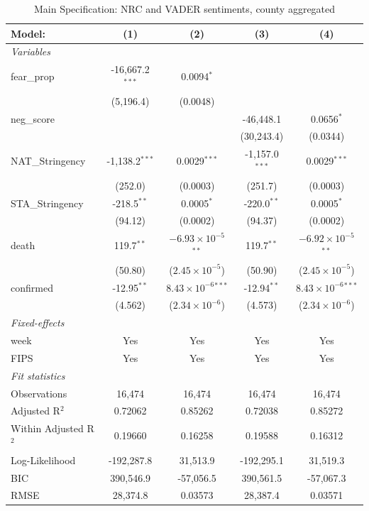 \documentclass{article}
\newcommand{\ra}[1]{\renewcommand{\arraystretch}{#1}}
\begin{document}
\begin{singlespace}
\centering
\begin{table}[!htb]
\caption{Main Specification: NRC and VADER sentiments, county aggregated}
\label{tab:mainspec}
\ra{0.6}
\begin{tabular}{lcccc}
  \tabularnewline\midrule\midrule
  Model:&(1) & (2) & (3) & (4)\\
  \midrule \emph{Variables}&   &   &   &  \\
  fear\_prop&-16,667.2$^{***}$ & 0.0094$^{*}$ &    &   \\
    &(5,196.4) & (0.0048) &    &   \\
  neg\_score&   &    & -46,448.1 & 0.0656$^{*}$\\
    &   &    & (30,243.4) & (0.0344)\\
  NAT\_Stringency&-1,138.2$^{***}$ & 0.0029$^{***}$ & -1,157.0$^{***}$ & 0.0029$^{***}$\\
    &(252.0) & (0.0003) & (251.7) & (0.0003)\\
  STA\_Stringency&-218.5$^{**}$ & 0.0005$^{*}$ & -220.0$^{**}$ & 0.0005$^{*}$\\
    &(94.12) & (0.0002) & (94.37) & (0.0002)\\
  death&119.7$^{**}$ & $-6.93\times 10^{-5}$$^{**}$ & 119.7$^{**}$ & $-6.92\times 10^{-5}$$^{**}$\\
    &(50.80) & ($2.45\times 10^{-5}$) & (50.90) & ($2.45\times 10^{-5}$)\\
  confirmed&-12.95$^{**}$ & $8.43\times 10^{-6}$$^{***}$ & -12.94$^{**}$ & $8.43\times 10^{-6}$$^{***}$\\
    &(4.562) & ($2.34\times 10^{-6}$) & (4.573) & ($2.34\times 10^{-6}$)\\
  \midrule \emph{Fixed-effects}&   &   &   &  \\
  week & Yes & Yes & Yes & Yes\\
  FIPS & Yes & Yes & Yes & Yes\\
  \midrule \emph{Fit statistics}&  & & & \\
  Observations & 16,474&16,474&16,474&16,474\\
  Adjusted R$^2$ & 0.72062&0.85262&0.72038&0.85272\\
Within Adjusted R$^2$ & 0.19660&0.16258&0.19588&0.16312\\
  Log-Likelihood & -192,287.8&31,513.9&-192,295.1&31,519.3\\
  BIC & 390,546.9&-57,056.5&390,561.5&-57,067.3\\
  RMSE & 28,374.8&0.03573&28,387.4&0.03571\\

\end{tabular}
\end{table}
\end{singlespace}
\end{document}
